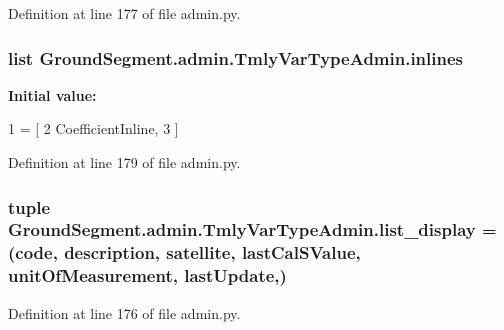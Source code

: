 Definition at line 177 of file admin.\+py.

\hypertarget{class_ground_segment_1_1admin_1_1_tmly_var_type_admin_a055edc4b536c6a55123bdf1f81b0120b}{}
\subsubsection[{inlines}]{\setlength{\rightskip}{0pt plus 5cm}list Ground\+Segment.\+admin.\+Tmly\+Var\+Type\+Admin.\+inlines\hspace{0.3cm}{\ttfamily [static]}}\label{class_ground_segment_1_1admin_1_1_tmly_var_type_admin_a055edc4b536c6a55123bdf1f81b0120b}
{\bfseries Initial value\+:}
\begin{DoxyCode}
1 = [
2         CoefficientInline,
3     ]
\end{DoxyCode}


Definition at line 179 of file admin.\+py.

\hypertarget{class_ground_segment_1_1admin_1_1_tmly_var_type_admin_aa75f4221ac105012fa994d5022cafd6c}{}
\subsubsection[{list\+\_\+display}]{\setlength{\rightskip}{0pt plus 5cm}tuple Ground\+Segment.\+admin.\+Tmly\+Var\+Type\+Admin.\+list\+\_\+display = (\textquotesingle{}code\textquotesingle{}, \textquotesingle{}description\textquotesingle{}, \textquotesingle{}satellite\textquotesingle{}, \textquotesingle{}last\+Cal\+S\+Value\textquotesingle{}, \textquotesingle{}unit\+Of\+Measurement\textquotesingle{}, \textquotesingle{}last\+Update\textquotesingle{},)\hspace{0.3cm}{\ttfamily [static]}}\label{class_ground_segment_1_1admin_1_1_tmly_var_type_admin_aa75f4221ac105012fa994d5022cafd6c}


Definition at line 176 of file admin.\+py.

\hypertarget{class_ground_segment_1_1admin_1_1_tmly_var_type_admin_ae6c46f02641f1897cceac59963725ab4}{}
